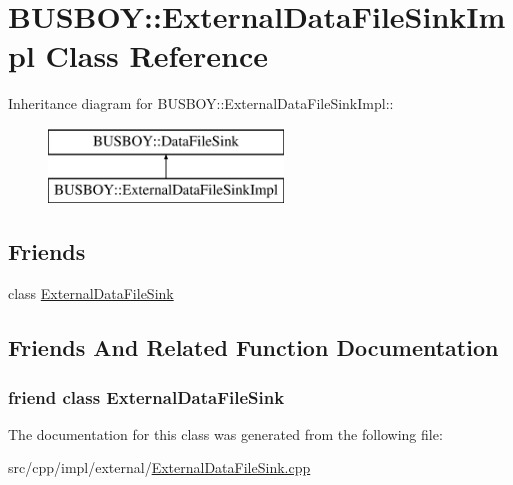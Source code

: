 \hypertarget{classBUSBOY_1_1ExternalDataFileSinkImpl}{
\section{BUSBOY::ExternalDataFileSinkImpl Class Reference}
\label{classBUSBOY_1_1ExternalDataFileSinkImpl}
}
Inheritance diagram for BUSBOY::ExternalDataFileSinkImpl::\begin{figure}[H]
\begin{center}
\leavevmode
\includegraphics[height=2cm]{classBUSBOY_1_1ExternalDataFileSinkImpl}
\end{center}
\end{figure}
\subsection*{Friends}
\begin{DoxyCompactItemize}
\item 
class \hyperlink{classBUSBOY_1_1ExternalDataFileSinkImpl_a72bd48bc3c328a799f350022036538fc}{ExternalDataFileSink}
\end{DoxyCompactItemize}


\subsection{Friends And Related Function Documentation}
\hypertarget{classBUSBOY_1_1ExternalDataFileSinkImpl_a72bd48bc3c328a799f350022036538fc}{
\subsubsection[{ExternalDataFileSink}]{\setlength{\rightskip}{0pt plus 5cm}friend class {\bf ExternalDataFileSink}}}
\label{classBUSBOY_1_1ExternalDataFileSinkImpl_a72bd48bc3c328a799f350022036538fc}


The documentation for this class was generated from the following file:\begin{DoxyCompactItemize}
\item 
src/cpp/impl/external/\hyperlink{ExternalDataFileSink_8cpp}{ExternalDataFileSink.cpp}\end{DoxyCompactItemize}
